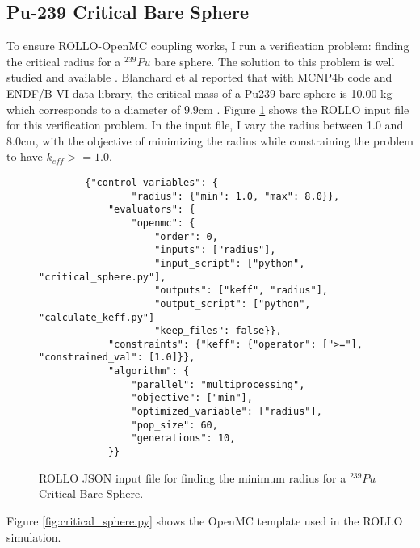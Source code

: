 \subsection{Pu-239 Critical Bare Sphere}
To ensure \gls{ROLLO}-OpenMC coupling works, I run a verification problem:
finding the critical radius for a $^{239}Pu$ bare sphere. 
The solution to this problem is well studied and available \cite{blanchard_updated_1999}. 
Blanchard et al reported that with MCNP4b code and ENDF/B-VI data library, the 
critical mass of a Pu239 bare sphere is 10.00 kg which corresponds to a diameter 
of 9.9cm \cite{blanchard_updated_1999}.
Figure \ref{fig:verification-sphere} shows the ROLLO input file for this verification 
problem. 
In the input file, I vary the radius between 1.0 and 8.0cm, with the objective of 
minimizing the radius while constraining the problem to have $k_{eff} >= 1.0$.
\begin{figure}[htbp]
    \begin{verbatim}
        {"control_variables": {
                "radius": {"min": 1.0, "max": 8.0}},
            "evaluators": {
                "openmc": {
                    "order": 0, 
                    "inputs": ["radius"],
                    "input_script": ["python", "critical_sphere.py"],
                    "outputs": ["keff", "radius"],
                    "output_script": ["python", "calculate_keff.py"]
                    "keep_files": false}},
            "constraints": {"keff": {"operator": [">="], "constrained_val": [1.0]}},
            "algorithm": {
                "parallel": "multiprocessing",
                "objective": ["min"],
                "optimized_variable": ["radius"],
                "pop_size": 60, 
                "generations": 10,
            }}
    \end{verbatim}
    \caption{\acrfull{ROLLO} JSON input file for finding the minimum radius for 
    a $^{239}Pu$ Critical Bare Sphere.}
    \label{fig:verification-sphere}
\end{figure}
\pagebreak
Figure \ref{fig:critical_sphere.py} shows the OpenMC template used in the 
\gls{ROLLO} simulation. 
